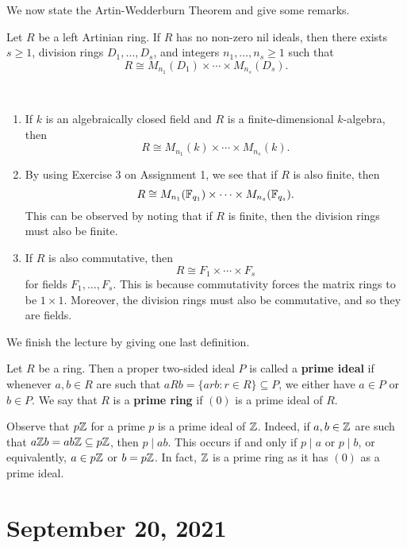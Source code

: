 We now state the Artin-Wedderburn Theorem and give some remarks. 

\begin{thm}
Let $R$ be a left Artinian ring. If $R$ has no non-zero nil ideals, then there exists $s \geq 1$, 
division rings $D_1, \dots, D_s$, and integers $n_1, \dots, n_s \geq 1$ such that 
\[ R \cong M_{n_1}(D_1) \times \cdots \times M_{n_s}(D_s). \]
\end{thm}

\begin{remark}~
\begin{enumerate}[(1)]
    \item If $k$ is an algebraically closed field and $R$ is a finite-dimensional $k$-algebra, then 
    \[ R \cong M_{n_1}(k) \times \cdots \times M_{n_s}(k). \]
    \item By using Exercise 3 on Assignment 1, we see that if $R$ is also finite, then 
    \[ R \cong M_{n_1}(\mathbb{F}_{q_1}) \times \cdots \times M_{n_s}(\mathbb{F}_{q_s}). \]
    This can be observed by noting that if $R$ is finite, then the division rings must also be finite. 
    \item If $R$ is also commutative, then 
    \[ R \cong F_1 \times \cdots \times F_s \]
    for fields $F_1, \dots, F_s$. This is because commutativity forces the matrix rings to be 
    $1 \times 1$. Moreover, the division rings must also be commutative, and so they are fields.
\end{enumerate}
\end{remark}

We finish the lecture by giving one last definition. 

\begin{defn}
Let $R$ be a ring. Then a proper two-sided ideal $P$ is called a {\bf prime ideal} if whenever $a, b \in R$
are such that $aRb = \{arb : r \in R\} \subseteq P$, we either have $a \in P$ or $b \in P$.
We say that $R$ is a {\bf prime ring} if $(0)$ is a prime ideal of $R$. 
\end{defn}

\begin{exmp}
Observe that $p\mathbb{Z}$ for a prime $p$ is a prime ideal of $\mathbb{Z}$. Indeed, if $a, b \in \mathbb{Z}$ are such that 
$a\mathbb{Z} b = ab\mathbb{Z} \subseteq p\mathbb{Z}$, then $p \mid ab$. This occurs if and only if $p \mid a$ or $p \mid b$, 
or equivalently, $a \in p\mathbb{Z}$ or $b = p\mathbb{Z}$. In fact, $\mathbb{Z}$ is a prime ring as it has $(0)$ as a prime 
ideal. 
\end{exmp}

\section{September 20, 2021}

